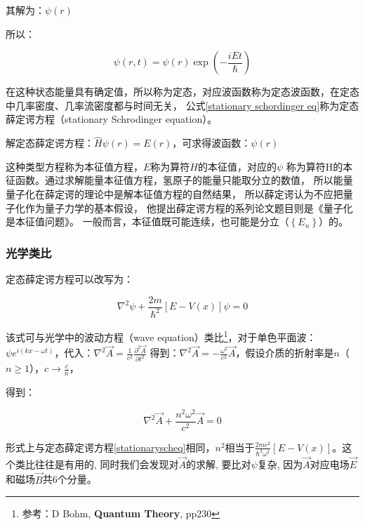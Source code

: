 
其解为：$\psi (r)$

所以：

\begin{equation}
\psi (r,t) = \psi (r)\exp \left( { - \frac{{iEt}}{\hbar }} \right)
\end{equation}

在这种状态能量具有确定值，所以称为定态，对应波函数称为定态波函数，在定态中几率密度、几率流密度都与时间无关，
公式\ref{stationary schordinger eq}称为定态薛定谔方程（stationary
Schrodinger equation）。

解定态薛定谔方程：$\hat H\psi (r) = E(r)$，可求得波函数：$\psi (r)$

这种类型方程称为本征值方程，$E$称为算符$H$的本征值，对应的$\psi$
称为算符H的本征函数。通过求解能量本征值方程，氢原子的能量只能取分立的数值，
所以能量量子化在薛定谔的理论中是解本征值方程的自然结果，
所以薛定谔认为不应把量子化作为量子力学的基本假设，
他提出薛定谔方程的系列论文题目则是《量子化是本征值问题》。
一般而言，本征值既可能连续，也可能是分立（$\left\{ {E_n }
\right\}$）的。

\subsubsection{光学类比}

定态薛定谔方程可以改写为：

\begin{equation}\label{stationaryscheq}
 \nabla^2 \psi + \frac{2m}{\hbar^2} \left[ {E - V(x)} \right] \psi =0
\end{equation}


该式可与光学中的波动方程（wave equation）类比\footnote{参考：D Bohm,
\textbf{Quantum Theory}, pp230}，对于单色平面波：$\psi e^{i (kx -
\omega t)}$，代入：$\nabla^2 \vec{A} = \frac{1}{c^2}
\frac{\partial^2 \vec{A}}{\partial t^2}$ 得到：$\nabla^2 \vec{A} = -
\frac{\omega^2}{c^2} \vec{A}$，假设介质的折射率是$n$（$n \ge
1$），$c \to \frac{c}{n}$，

得到：

\begin{equation*}
   \nabla^2 \vec{A} + \frac{n^2 \omega^2}{c^2} \vec{A} = 0
\end{equation*}


形式上与定态薛定谔方程\ref{stationaryscheq}相同，$n^2$相当于$\frac{2m
c^2}{\hbar^2 \omega^2} \left[ {E - V(x)}
\right]$。这个类比往往是有用的, 同时我们会发现对$\vec{A}$的求解,
要比对$\psi$复杂,
因为$\vec{A}$对应电场$\vec{E}$和磁场$\vec{B}$共6个分量。



